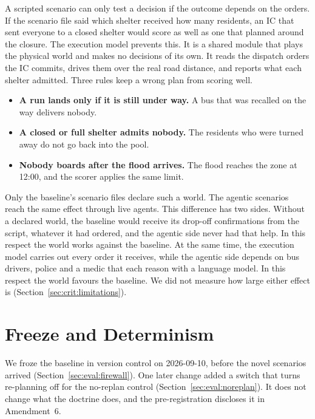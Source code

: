 A scripted scenario can only test a decision if the outcome depends on the
orders. If the scenario file said which shelter received how many residents, an
IC that sent everyone to a closed shelter would score as well as one that
planned around the closure. The execution model prevents this. It is a shared
module that plays the physical world and makes no decisions of its own. It
reads the dispatch orders the IC commits, drives them over the real road
distance, and reports what each shelter admitted. Three rules keep a wrong
plan from scoring well.
\begin{itemize}
  \item \textbf{A run lands only if it is still under way.} A bus that was
  recalled on the way delivers nobody.
  \item \textbf{A closed or full shelter admits nobody.} The residents who
  were turned away do not go back into the pool.
  \item \textbf{Nobody boards after the flood arrives.} The flood reaches the
  zone at 12:00, and the scorer applies the same limit.
\end{itemize}
Only the baseline's scenario files declare such a world. The agentic scenarios
reach the same effect through live agents. This difference has two sides.
Without a declared world, the baseline would receive its drop-off
confirmations from the script, whatever it had ordered, and the agentic side
never had that help. In this respect the world works against the baseline. At
the same time, the execution model carries out every order it receives, while
the agentic side depends on bus drivers, police and a medic that each reason
with a language model. In this respect the world favours the baseline. We did
not measure how large either effect is (Section~\ref{sec:crit:limitations}).

\section{Freeze and Determinism}
\label{sec:wf:freeze}
\label{sec:wf:cli}

We froze the baseline in version control on 2026-09-10, before the novel
scenarios arrived (Section~\ref{sec:eval:firewall}). One later change added a
switch that turns re-planning off for the no-replan
control (Section~\ref{sec:eval:noreplan}). It does not change what the doctrine
does, and the pre-registration discloses it in Amendment~6.

